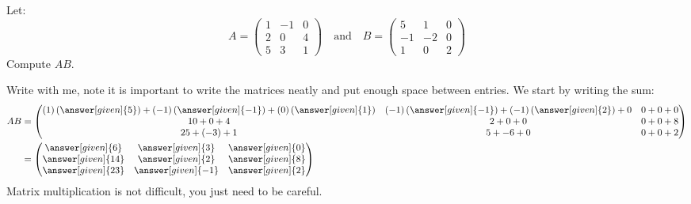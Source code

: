 \documentclass{ximera}
\begin{document}
\begin{example}
  Let:
  \[
  A = \begin{pmatrix}
    1 & -1 & 0\\
    2 & 0 & 4 \\
    5 & 3 & 1
  \end{pmatrix}
  \quad\text{and}\quad B =
  \begin{pmatrix}
    5 & 1 & 0\\
    -1 & -2 & 0\\
    1 & 0 & 2
  \end{pmatrix}
  \]
  Compute $AB$.
  \begin{explanation}
    Write with me, note it is important to write the matrices neatly
    and put enough space between entries. We start by writing the sum:
    \begin{align*}
      AB &= \begin{pmatrix}
        (1)\left(\answer[given]{5}\right) + (-1)\left(\answer[given]{-1}\right)+ (0)\left(\answer[given]{1}\right) & (-1)\left(\answer[given]{-1}\right) + (-1)\left(\answer[given]{2}\right)+ 0 & 0 + 0+ 0\\
        10 + 0 + 4 & 2 + 0+0 & 0 + 0+8\\
        25+ (-3) + 1 & 5 + -6+0 & 0 + 0+ 2
      \end{pmatrix}\\
      &= \begin{pmatrix}
        \answer[given]{6} &  \answer[given]{3} &  \answer[given]{0}\\
         \answer[given]{14}&  \answer[given]{2} &  \answer[given]{8}\\
         \answer[given]{23} &  \answer[given]{-1} &  \answer[given]{2}
      \end{pmatrix}
    \end{align*}
    Matrix multiplication is not difficult, you just need to be
    careful.
  \end{explanation}
\end{example}




\end{document}
